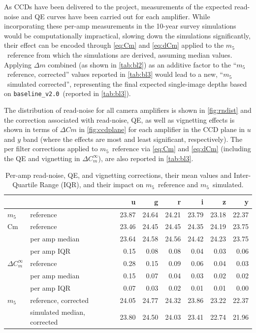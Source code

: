 \documentclass[PST,authoryear,toc]{lsstdoc}
\newcommand{\mf}{\ensuremath{m_5}}
\newcommand{\baseline}{\texttt{baseline\_v2.0}}
\begin{document}
As CCDs have been delivered to the project, measurements of the expected read-noise and QE curves have been carried out for each amplifier. While incorporating these per-amp measurements in the 10-year survey simulations would be computationally impractical, slowing down the simulations significantly, their effect can be encoded through \autoref{eq:Cm} and \autoref{eq:dCm} applied to the \mf\ reference from which the simulations are derived, assuming median values. Applying $\Delta m$ combined (as shown in \autoref{tab:bl2}) as an additive factor to the ``\mf\ reference, corrected'' values reported in \autoref{tab:bl3} would lead to a new,  ``\mf\ simulated corrected'', representing the final expected single-image depths based on \baseline\ (reported in \autoref{tab:bl3}).

The distribution of read-noise for all camera amplifiers is shown in \autoref{fig:rndist} and the correction associated with read-noise, QE, as well as vignetting effects is shown in terms of $\Delta Cm$ in \autoref{fig:ccdplane} for each amplifier in the CCD plane in $u$ and $y$ band (where the effects are most and least significant, respectively).
The per filter corrections applied to \mf\ reference via \autoref{eq:Cm} and \autoref{eq:dCm} (including the QE and vignetting in $\Delta C_m^\infty$), are also reported in \autoref{tab:bl3}.

\FloatBarrier

\begin{table}\caption{Per-amp read-noise, QE, and vignetting corrections, their mean values and Inter-Quartile Range (IQR), and their impact on \mf\ reference and \mf\ simulated.}\label{tab:bl3}
    \centering
 \begin{tabular}{llrrrrrr}
 \hline
 {} & &             u &      g &  r &   i &     z &      y \\
\hline
\mf &  reference &  23.87 &  24.64 &  24.21 &  23.79 &  23.18 &  22.37 \\
\hline
\hline
Cm & reference &  23.46 &  24.45 &  24.45 &  24.35 &  24.19 &  23.75 \\
 &per amp median       &  23.64 &  24.58 &  24.56 &  24.42 &  24.23 &  23.75 \\
& per amp IQR          &   0.15 &   0.08 &   0.08 &   0.04 &   0.03 &   0.06 \\
\hline
 $\Delta C_m^\infty$ & reference       &   0.28 &   0.15 &   0.09 &   0.06 &   0.04 &   0.03 \\
 & per amp median  &   0.15 &   0.07 &   0.04 &   0.03 &   0.02 &   0.02 \\
 & per amp IQR     &   0.07 &   0.03 &   0.02 &   0.01 &   0.01 &   0.00 \\
  \hline
  \hline
\mf & reference, corrected       &  24.05 &  24.77 &  24.32 &  23.86 &  23.22 &  22.37 \\
&simulated median, corrected    &  23.80 &  24.50 &  24.03 &  23.41 &  22.74 &  21.96 \\ 
\end{tabular}
\end{table}
\FloatBarrier
\clearpage
\end{document}
